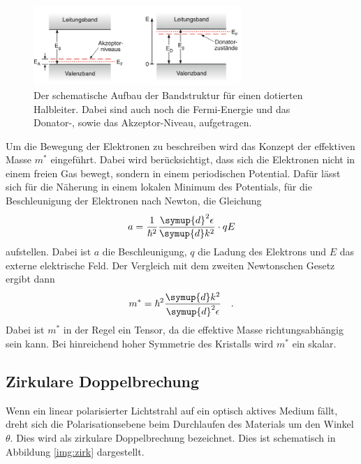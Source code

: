 \begin{figure}[H]
    \centering
    \includegraphics[width=0.7\textwidth]{latex/images/dotierung.PNG}
    \caption{Der schematische Aufbau der Bandstruktur für einen dotierten Halbleiter. 
    Dabei sind auch noch die Fermi-Energie und das Donator-, sowie das Akzeptor-Niveau, aufgetragen\protect \cite{Dem}.}
    \label{img:dot}
\end{figure}
\noindent
Um die Bewegung der Elektronen zu beschreiben wird das Konzept der effektiven Masse $m^*$ eingeführt. 
Dabei wird berücksichtigt, dass sich die Elektronen nicht in einem freien Gas bewegt, sondern in einem periodischen Potential. 
Dafür lässt sich für die Näherung in einem lokalen Minimum des Potentials, für die Beschleunigung der Elektronen nach Newton, die Gleichung
\begin{equation*}
    a = \frac{1}{\hslash^2}\frac{\symup{d}^2\epsilon}{\symup{d}k^2} \cdot qE 
\end{equation*} 
aufstellen. Dabei ist $a$ die Beschleunigung, $q$ die Ladung des Elektrons und $E$ das externe elektrische Feld.
Der Vergleich mit dem zweiten Newtonschen Gesetz ergibt dann
\begin{equation*}
    m^* =  \hbar^2 \frac{\symup{d}k^2}{\symup{d}^2\epsilon}\quad.
\end{equation*} 
Dabei ist $m^*$ in der Regel ein Tensor, da die effektive Masse richtungsabhängig sein kann.
Bei hinreichend hoher Symmetrie des Kristalls wird $m^*$ ein skalar. 



\subsection{Zirkulare Doppelbrechung}

\noindent Wenn ein linear polarisierter Lichtstrahl auf ein optisch aktives Medium fällt, dreht sich die Polarisationsebene beim Durchlaufen des Materials um den Winkel $\theta$.
Dies wird als zirkulare Doppelbrechung bezeichnet. Dies ist schematisch in Abbildung \ref{img:zirk} dargestellt.

